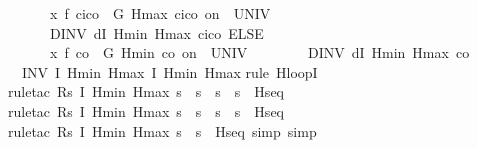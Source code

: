 \documentclass[envcountsame]{llncs}
\begin{document}
\begin{example}
\begin{isabellebody}
\ \ \ \ \ \ {\isacharparenleft}x{\isasymacute}{\isacharequal}\ f\ {\isacharparenleft}c\isactrlsub i{\isacharminus}c\isactrlsub o{\isacharparenright}\ {\isacharampersand}\ G\ Hmax\ {\isacharparenleft}c\isactrlsub i{\isacharminus}c\isactrlsub o{\isacharparenright}\ on\ {\isacharbraceleft}{}{\isachardot}{\isachardot}{\isasymtau}{\isacharbraceright}\ UNIV\ {\isacharat}\ {}\isanewline 
\ \ \ \ \ \ DINV\ {\isacharparenleft}dI\ Hmin\ Hmax\ {\isacharparenleft}c\isactrlsub i{\isacharminus}c\isactrlsub o{\isacharparenright}{\isacharparenright}{\isacharparenright}\ ELSE\ \isanewline
\ \ \ \ \ \ {\isacharparenleft}x{\isasymacute}{\isacharequal}\ f\ {\isacharparenleft}{\isacharminus}c\isactrlsub o{\isacharparenright}\ {\isacharampersand}\ G\ Hmin\ {\isacharparenleft}{\isacharminus}c\isactrlsub o{\isacharparenright}\ on\ {\isacharbraceleft}{}{\isachardot}{\isachardot}{\isasymtau}{\isacharbraceright}\ UNIV\ {\isacharat}\ {}\isanewline 
\ \ \ \ \ \ DINV\ {\isacharparenleft}dI\ Hmin\ Hmax\ {\isacharparenleft}{\isacharminus}c\isactrlsub o{\isacharparenright}{\isacharparenright}{\isacharparenright}{\isacharparenright}\ {\isacharparenright}\isanewline
\ \ INV\ I\ Hmin\ Hmax{\isacharparenright}\ {\isasymlceil}I\ Hmin\ Hmax{\isasymrceil}{\isachardoublequoteclose}\isanewline
{}\isamarkupfalse%
{\isacharparenleft}rule\ H{\isacharunderscore}loopI{\isacharparenright}\isanewline
\ \ \ \ \isamarkupfalse%
{\isacharparenleft}rule{\isacharunderscore}tac\ R{\isacharequal}{\isachardoublequoteopen}{\isasymlambda}s{\isachardot}\ I\ Hmin\ Hmax\ s\ {\isasymand}\ s{\isachardollar}{}{\isacharequal}{}\ {\isasymand}\ s{\isachardollar}{}\ {\isacharequal}\ s{\isachardollar}{}{\isachardoublequoteclose}\ \ H{\isacharunderscore}seq{\isacharparenright}\isanewline
\ \ \ \ \ \isamarkupfalse%
{\isacharparenleft}rule{\isacharunderscore}tac\ R{\isacharequal}{\isachardoublequoteopen}{\isasymlambda}s{\isachardot}\ I\ Hmin\ Hmax\ s\ {\isasymand}\ s{\isachardollar}{}{\isacharequal}{}\ {\isasymand}\ s{\isachardollar}{}\ {\isacharequal}\ s{\isachardollar}{}{\isachardoublequoteclose}\ \ H{\isacharunderscore}seq{\isacharparenright}\isanewline
\ \ \ \ \ \ \isamarkupfalse%
{\isacharparenleft}rule{\isacharunderscore}tac\ R{\isacharequal}{\isachardoublequoteopen}{\isasymlambda}s{\isachardot}\ I\ Hmin\ Hmax\ s\ {\isasymand}\ s{\isachardollar}{}{\isacharequal}{}{\isachardoublequoteclose}\ \ H{\isacharunderscore}seq{\isacharcomma}\ simp{\isacharcomma}\ simp{\isacharparenright}\isanewline

\end{isabellebody}
\end{example}
\end{document}
